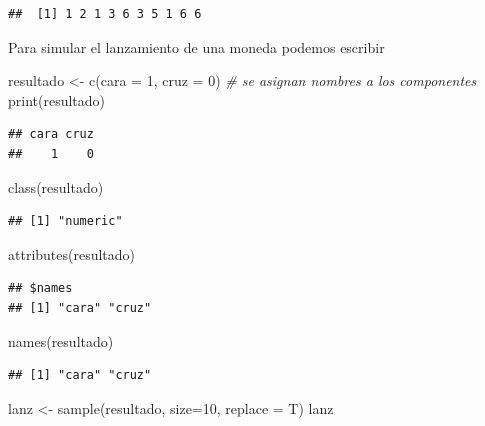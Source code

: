 \documentclass[
]{book}
\newenvironment{Shaded}{\begin{snugshade}}{\end{snugshade}}
\newcommand{\AttributeTok}[1]{\textcolor[rgb]{0.77,0.63,0.00}{#1}}
\newcommand{\CommentTok}[1]{\textcolor[rgb]{0.56,0.35,0.01}{\textit{#1}}}
\newcommand{\DecValTok}[1]{\textcolor[rgb]{0.00,0.00,0.81}{#1}}
\newcommand{\FunctionTok}[1]{\textcolor[rgb]{0.00,0.00,0.00}{#1}}
\newcommand{\NormalTok}[1]{#1}
\newcommand{\OtherTok}[1]{\textcolor[rgb]{0.56,0.35,0.01}{#1}}
\theoremstyle{break}
\theoremstyle{nonumberplain}
\begin{document}
\begin{verbatim}
##  [1] 1 2 1 3 6 3 5 1 6 6
\end{verbatim}

Para simular el lanzamiento de una moneda podemos escribir

\begin{Shaded}
\begin{Highlighting}[]
\NormalTok{resultado }\OtherTok{\textless{}{-}} \FunctionTok{c}\NormalTok{(}\AttributeTok{cara =} \DecValTok{1}\NormalTok{, }\AttributeTok{cruz =} \DecValTok{0}\NormalTok{) }\CommentTok{\# se asignan nombres a los componentes}
\FunctionTok{print}\NormalTok{(resultado)}
\end{Highlighting}
\end{Shaded}

\begin{verbatim}
## cara cruz 
##    1    0
\end{verbatim}

\begin{Shaded}
\begin{Highlighting}[]
\FunctionTok{class}\NormalTok{(resultado)}
\end{Highlighting}
\end{Shaded}

\begin{verbatim}
## [1] "numeric"
\end{verbatim}

\begin{Shaded}
\begin{Highlighting}[]
\FunctionTok{attributes}\NormalTok{(resultado)}
\end{Highlighting}
\end{Shaded}

\begin{verbatim}
## $names
## [1] "cara" "cruz"
\end{verbatim}

\begin{Shaded}
\begin{Highlighting}[]
\FunctionTok{names}\NormalTok{(resultado)}
\end{Highlighting}
\end{Shaded}

\begin{verbatim}
## [1] "cara" "cruz"
\end{verbatim}

\begin{Shaded}
\begin{Highlighting}[]
\NormalTok{lanz }\OtherTok{\textless{}{-}} \FunctionTok{sample}\NormalTok{(resultado, }\AttributeTok{size=}\DecValTok{10}\NormalTok{, }\AttributeTok{replace =}\NormalTok{ T)}
\NormalTok{lanz}
\end{Highlighting}
\end{Shaded}
\end{document}
